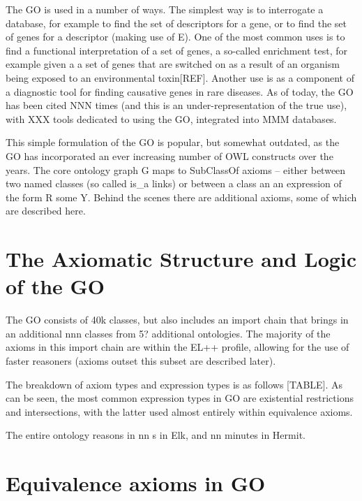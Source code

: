 \documentclass{llncs}
\begin{document}
The GO is used in a number of ways. The simplest way is to interrogate
a database, for example to find the set of descriptors for a gene, or
to find the set of genes for a descriptor (making use of E). One of
the most common uses is to find a functional interpretation of a set
of genes, a so-called enrichment test, for example given a a set of
genes that are switched on as a result of an organism being exposed to
an environmental toxin[REF]. Another use is as a component of a
diagnostic tool for finding causative genes in rare
diseases\cite{Phevor}. As of today, the GO has been cited NNN times
(and this is an under-representation of the true use), with XXX tools
dedicated to using the GO, integrated into MMM databases.

This simple formulation of the GO is popular, but somewhat outdated,
as the GO has incorporated an ever increasing number of OWL constructs
over the years. The core ontology graph G maps to SubClassOf axioms --
either between two named classes (so called is\_a links) or between a
class an an expression of the form R some Y. Behind the scenes there
are additional axioms, some of which are described here.

\section{The Axiomatic Structure and Logic of the GO}

The GO consists of 40k classes, but also includes an import chain that brings in an additional nnn classes from 5? additional ontologies. The majority of the axioms in this import chain are within the EL++ profile, allowing for the use of faster reasoners (axioms outset this subset are described later).

The breakdown of axiom types and expression types is as follows [TABLE]. As can be seen, the most common expression types in GO are existential restrictions and intersections, with the latter used almost entirely within equivalence axioms.

The entire ontology reasons in nn s in Elk\cite{Kazakov2014}, and nn minutes in Hermit.

\section{Equivalence axioms in GO}
\end{document}
